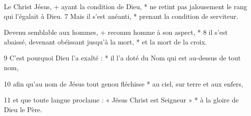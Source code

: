 Le Christ Jésus, +
ayant la condition de Dieu, *
ne retint pas jalousement
le rang qui l'égalait à Dieu.
7 Mais il s'est anéanti, *
prenant la condition de serviteur.

Devenu semblable aux hommes, +
reconnu homme à son aspect, *
8 il s'est abaissé,
devenant obéissant jusqu'à la mort, *
et la mort de la croix.

9 C'est pourquoi Dieu l'a exalté : *
il l'a doté du Nom
qui est au-dessus de tout nom,

10 afin qu'au nom de Jésus
tout genou fléchisse *
au ciel, sur terre et aux enfers,

11  et que toute langue proclame :
« Jésus Christ est Seigneur » *
à la gloire de Dieu le Père.